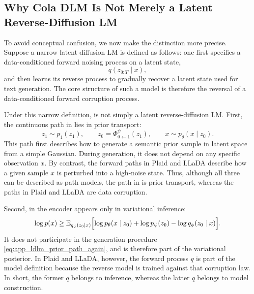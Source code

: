 \subsection{Why Cola DLM Is Not Merely a Latent Reverse-Diffusion LM}
\label{app:not_simple_latent_diffusion}

To avoid conceptual confusion, we now make the distinction more precise. Suppose a narrow latent diffusion LM is defined as follows: one first specifies a data-conditioned forward noising process on a latent state,
\begin{equation}
q(z_{0:T}\mid x),
\label{eq:app_narrow_latent_diffusion_def}
\end{equation}
and then learns its reverse process to gradually recover a latent state used for text generation. The core structure of such a model is therefore the reversal of a data-conditioned forward corruption process.

Under this narrow definition, \method is not simply a latent reverse-diffusion LM. First, the continuous path in \method lies in prior transport:
\begin{equation}
z_1\sim p_1(z_1),
\qquad
z_0=\Phi^{\psi}_{0\leftarrow 1}(z_1),
\qquad
x\sim p_{\theta}(x\mid z_0).
\label{eq:app_ldlm_prior_path_again}
\end{equation}
This path first describes how to generate a semantic prior sample in latent space from a simple Gaussian. During generation, it does not depend on any specific observation $x$. By contrast, the forward paths in Plaid and LLaDA describe how a given sample $x$ is perturbed into a high-noise state. Thus, although all three can be described as path models, the path in \method is prior transport, whereas the paths in Plaid and LLaDA are data corruption.

Second, in \method the encoder appears only in variational inference:
\begin{equation}
\log p(x)
\ge
\mathbb{E}_{q_{\phi}(z_0\mid x)}\Bigl[
\log p_{\theta}(x\mid z_0)+\log p_{\psi}(z_0)-\log q_{\phi}(z_0\mid x)
\Bigr].
\label{eq:app_encoder_only_in_elbo}
\end{equation}
It does not participate in the generation procedure \eqref{eq:app_ldlm_prior_path_again}, and is therefore part of the variational posterior. In Plaid and LLaDA, however, the forward process $q$ is part of the model definition because the reverse model is trained against that corruption law. In short, the former $q$ belongs to inference, whereas the latter $q$ belongs to model construction.

